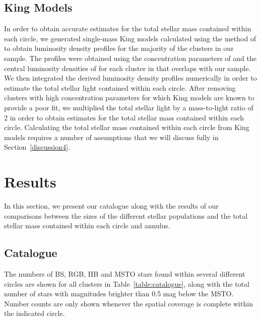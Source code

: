 \subsection{King Models} \label{king4}

In order to obtain accurate estimates for the total stellar mass
contained within each circle, we generated 
single-mass King models calculated using the method of
\citet{sigurdsson95} to obtain luminosity density profiles
for the 
majority of the clusters in our sample.  The profiles were obtained using
the concentration parameters of \citet{mclaughlin05} and the central
luminosity densities of \citet{harris96} for each cluster in
\citet{mclaughlin05} that overlaps with our sample.  We then
integrated the derived 
luminosity density profiles numerically in order to estimate the total
stellar light contained within each circle.  After removing clusters
with high concentration parameters \citep{harris96} for which King
models are known to provide a poor fit, we multiplied the total
stellar light by a mass-to-light ratio of 2 in order to obtain
estimates for the total stellar mass contained within each circle.
Calculating the total stellar mass contained within each
circle from King models requires a number of assumptions that we will
discuss fully in Section~\ref{discussion4}.

\section{Results} \label{results4}

In this section, we present our catalogue along with the results of
our comparisons between the 
sizes of the different stellar populations and the total stellar mass
contained within each circle and annulus.

\subsection{Catalogue}  \label{catalogue4}

The numbers of BS, RGB, HB and MSTO stars found within several
different circles are shown for all clusters in
Table~\ref{table:catalogue}, along with the total number of stars 
with magnitudes brighter than 0.5 mag below the MSTO.  Number counts
are only shown whenever the spatial coverage is complete within the
indicated circle.

\clearpage

